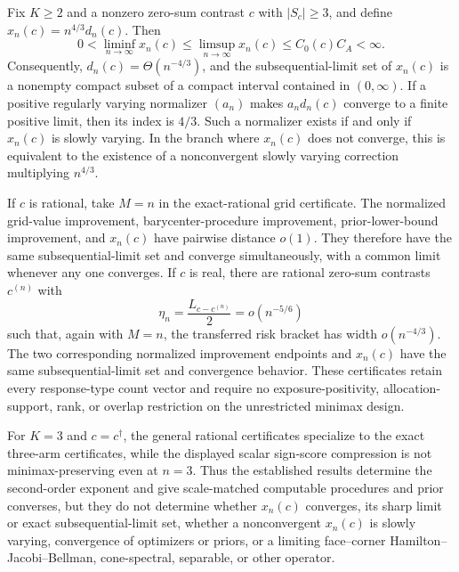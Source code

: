 Fix \(K\geq2\) and a nonzero zero-sum contrast \(c\) with \(|S_c|\geq3\), and define \(x_n(c)=n^{4/3}d_n(c)\). Then
\[
 0<\liminf_{n\to\infty}x_n(c)
 \leq\limsup_{n\to\infty}x_n(c)
 \leq C_0(c)C_A<\infty.
\]
Consequently, \(d_n(c)=\Theta(n^{-4/3})\), and the subsequential-limit set of \(x_n(c)\) is a nonempty compact subset of a compact interval contained in \((0,\infty)\). If a positive regularly varying normalizer \((a_n)\) makes \(a_nd_n(c)\) converge to a finite positive limit, then its index is \(4/3\). Such a normalizer exists if and only if \(x_n(c)\) is slowly varying. In the branch where \(x_n(c)\) does not converge, this is equivalent to the existence of a nonconvergent slowly varying correction multiplying \(n^{4/3}\).

If \(c\) is rational, take \(M=n\) in the exact-rational grid certificate. The normalized grid-value improvement, barycenter-procedure improvement, prior-lower-bound improvement, and \(x_n(c)\) have pairwise distance \(o(1)\). They therefore have the same subsequential-limit set and converge simultaneously, with a common limit whenever any one converges. If \(c\) is real, there are rational zero-sum contrasts \(c^{(n)}\) with
\[
 \eta_n=\frac{L_{c-c^{(n)}}}{2}=o(n^{-5/6})
\]
such that, again with \(M=n\), the transferred risk bracket has width \(o(n^{-4/3})\). The two corresponding normalized improvement endpoints and \(x_n(c)\) have the same subsequential-limit set and convergence behavior. These certificates retain every response-type count vector and require no exposure-positivity, allocation-support, rank, or overlap restriction on the unrestricted minimax design.

For \(K=3\) and \(c=c^\dagger\), the general rational certificates specialize to the exact three-arm certificates, while the displayed scalar sign-score compression is not minimax-preserving even at \(n=3\). Thus the established results determine the second-order exponent and give scale-matched computable procedures and prior converses, but they do not determine whether \(x_n(c)\) converges, its sharp limit or exact subsequential-limit set, whether a nonconvergent \(x_n(c)\) is slowly varying, convergence of optimizers or priors, or a limiting face--corner Hamilton--Jacobi--Bellman, cone-spectral, separable, or other operator.
